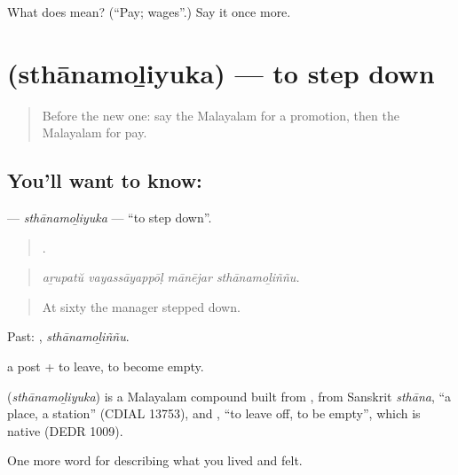\begin{tcolorbox}[breakable,colback=teal!4,colframe=teal!35!black,title={Before you move on}]
What does  mean? (\textquotedblleft{}Pay; wages\textquotedblright{}.) Say it once more.
\end{tcolorbox}
\section[\texorpdfstring{\ml{സ്ഥാനമൊഴിയുക} (sthānamoḻiyuka)}{സ്ഥാനമൊഴിയുക (sthānamoḻiyuka)}]{ (sthānamoḻiyuka) — to step down}

\label{lesson:ML-C542-sthanamoliyuka}



\begin{quote}
Before the new one: say the Malayalam for a promotion, then the Malayalam for pay.
\end{quote}

\subsection*{You'll want to know: }
\textbf{} — \emph{sthānamoḻiyuka} — \textquotedblleft{}to step down\textquotedblright{}.

\begin{quote}
   .
\end{quote}

\begin{quote}
\emph{aṟupatŭ vayassāyappōḷ mānējar sthānamoḻiññu.}
\end{quote}

\begin{quote}
At sixty the manager stepped down.
\end{quote}

Past: , \emph{sthānamoḻiññu}.

 a post +  to leave, to become empty.

\begin{cousinweb}
\textbf{} (\emph{sthānamoḻiyuka}) is a Malayalam compound built from , from Sanskrit \emph{sthāna}, \textquotedblleft{}a place, a station\textquotedblright{} (CDIAL 13753), and , \textquotedblleft{}to leave off, to be empty\textquotedblright{}, which is native (DEDR 1009).
\end{cousinweb}

\begin{grammarlens}[title={What you've built}]
One more word for describing what you lived and felt.
\end{grammarlens}

